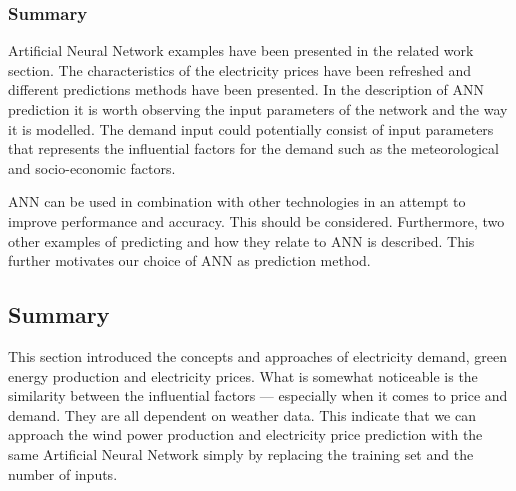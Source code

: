 \subsubsection{Summary}
Artificial Neural Network examples have been presented in the related work section. The characteristics of the electricity prices have been refreshed and different predictions methods have been presented. 
In the description of ANN prediction it is worth observing the input parameters of the network and the way it is modelled. The demand input could potentially consist of input parameters that represents the influential factors for the demand such as the meteorological and socio-economic factors.

ANN can be used in combination with other technologies in an attempt to improve performance and accuracy. This should be considered.
Furthermore, two other examples of predicting and how they relate to ANN is described. This further motivates our choice of ANN as prediction method.   

\subsection{Summary}
This section introduced the concepts and approaches of electricity demand, green energy production and electricity prices. What is somewhat noticeable is the similarity between the influential factors --- especially when it comes to price and demand. They are all dependent on weather data. This indicate that we can approach the wind power production and electricity price prediction with the same Artificial Neural Network simply by replacing the training set and the number of inputs.